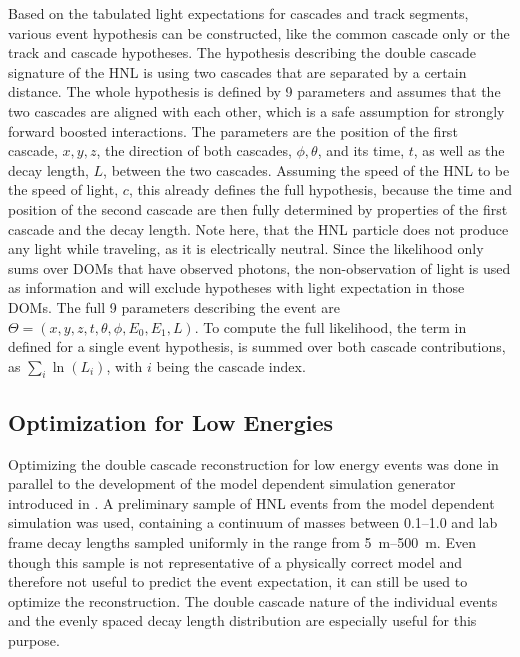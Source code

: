Based on the tabulated light expectations for cascades and track segments, various event hypothesis can be constructed, like the common cascade only or the track and cascade hypotheses. The hypothesis describing the double cascade signature of the HNL is using two cascades that are separated by a certain distance. The whole hypothesis is defined by 9 parameters and assumes that the two cascades are aligned with each other, which is a safe assumption for strongly forward boosted interactions. The parameters are the position of the first cascade, $x, y, z$, the direction of both cascades, $\phi, \theta$, and its time, $t$, as well as the decay length, $L$, between the two cascades. Assuming the speed of the HNL to be the speed of light, $c$, this already defines the full hypothesis, because the time and position of the second cascade are then fully determined by properties of the first cascade and the decay length. Note here, that the HNL particle does not produce any light while traveling, as it is electrically neutral. Since the likelihood only sums over DOMs that have observed photons, the non-observation of light is used as information and will exclude hypotheses with light expectation in those DOMs. The full 9 parameters describing the event are $\Theta = (x, y, z, t, \theta, \phi, E_0, E_1, L)$. To compute the full likelihood, the term in  defined for a single event hypothesis, is summed over both cascade contributions, as $\sum_i \ln(L_i)$, with $i$ being the cascade index.


\subsection{Optimization for Low Energies}

Optimizing the double cascade reconstruction for low energy events was done in parallel to the development of the model dependent simulation generator introduced in . A preliminary sample of HNL events from the model dependent simulation was used, containing a continuum of masses between \SIrange[range-phrase=~and~]{0.1}{1.0}{\gev} and lab frame decay lengths sampled uniformly in the range from \SIrange{5}{500}{\meter}. Even though this sample is not representative of a physically correct model and therefore not useful to predict the event expectation, it can still be used to optimize the reconstruction. The double cascade nature of the individual events and the evenly spaced decay length distribution are especially useful for this purpose.

